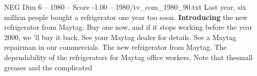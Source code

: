 \begin{textsample}{NEG Dim 6 – 1980 – Score -1.00 – 1980/tv\_com\_1980\_90.txt}  \label{ex:f6_neg_039}
Last year, six million people bought a refrigerator one year too soon. \textbf{Introducing} the new refrigerator from Maytag.
Buy one now, and if it stops working before the year 2000, we 'll buy it back.
See your Maytag dealer for details.
See a Maytag repairman in our commercials.
The new refrigerator from Maytag.
The dependability of the refrigerators for Maytag office workers.
Note that thesmall greases and the complicated

\end{textsample}
